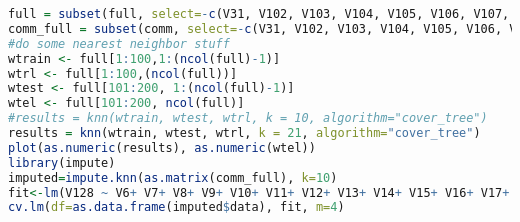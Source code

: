 \documentclass{article}
\begin{document}
\begin{lstlisting}[language=r]
full = subset(full, select=-c(V31, V102, V103, V104, V105, V106, V107, V108, V109, V111, V110, V112, V113, V114, V115, V116, V117, V118, V122, V123, V124, V125, V127))
comm_full = subset(comm, select=-c(V31, V102, V103, V104, V105, V106, V107, V108, V109, V111, V110, V112, V113, V114, V115, V116, V117, V118, V122, V123, V124, V125, V127))
#do some nearest neighbor stuff
wtrain <- full[1:100,1:(ncol(full)-1)]
wtrl <- full[1:100,(ncol(full))]
wtest <- full[101:200, 1:(ncol(full)-1)]
wtel <- full[101:200, ncol(full)]
#results = knn(wtrain, wtest, wtrl, k = 10, algorithm="cover_tree")
results = knn(wtrain, wtest, wtrl, k = 21, algorithm="cover_tree")
plot(as.numeric(results), as.numeric(wtel))
library(impute)
imputed=impute.knn(as.matrix(comm_full), k=10)
fit<-lm(V128 ~ V6+ V7+ V8+ V9+ V10+ V11+ V12+ V13+ V14+ V15+ V16+ V17+ V18+ V19+ V20+ V21+ V22+ V23+ V24+ V25+ V26+ V27+ V28+ V29+ V30+ V32+ V33+ V34+ V35+ V36+ V37+ V38+ V39+ V40+ V41+ V42+ V43+ V44+ V45+ V46+ V47+ V48+ V49+ V50+ V51+ V52+ V53+ V54+ V55+ V56+ V57+ V58+ V59+ V60+ V61+ V62+ V63+ V64+ V65+ V66+ V67+ V68+ V69+ V70+ V71+ V72+ V73+ V74+ V75+ V76+ V77+ V78+ V79+ V80+ V81+ V82+ V83+ V84+ V85+ V86+ V87+ V88+ V89+ V90+ V91+ V92+ V93+ V94+ V95+ V96+ V97+ V98+ V99+ V100+ V101+ V119+ V120+ V121+ V126, data=as.data.frame(imputed$data))
cv.lm(df=as.data.frame(imputed$data), fit, m=4)
\end{lstlisting}
\end{document}
